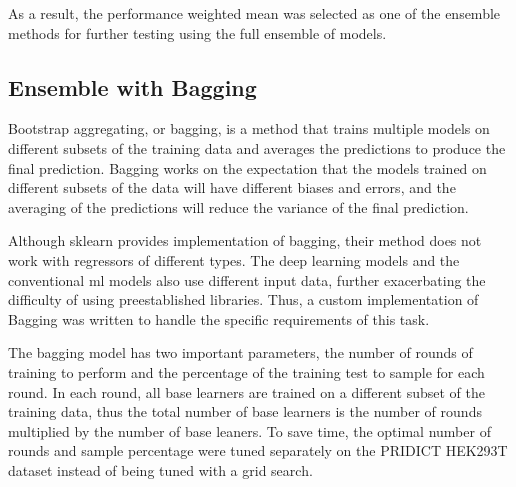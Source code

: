 As a result, the performance weighted mean was selected as one of the ensemble methods for further testing using the full ensemble of models.

\subsection{Ensemble with Bagging}

Bootstrap aggregating, or bagging, is a method that trains multiple models on different subsets of the training data and averages the predictions to produce the final prediction. Bagging works on the expectation that the models trained on different subsets of the data will have different biases and errors, and the averaging of the predictions will reduce the variance of the final prediction\cite{dongSurveyEnsembleLearning2020}.

Although sklearn provides implementation of bagging, their method does not work with regressors of different types. The deep learning models and the conventional ml models also use different input data, further exacerbating the difficulty of using preestablished libraries. Thus, a custom implementation of Bagging was written to handle the specific requirements of this task.

The bagging model has two important parameters, the number of rounds of training to perform and the percentage of the training test to sample for each round. In each round, all base learners are trained on a different subset of the training data, thus the total number of base learners is the number of rounds multiplied by the number of base leaners. To save time, the optimal number of rounds and sample percentage were tuned separately on the PRIDICT HEK293T dataset instead of being tuned with a grid search. 

